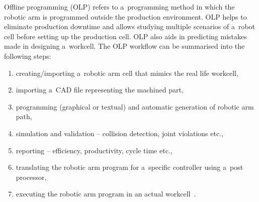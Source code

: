 Offline programming  (OLP) refers to a~programming method in which the robotic arm is programmed outside the production environment. OLP helps to eliminate production downtime and allows studying multiple scenarios of a~robot cell before setting up the production cell. OLP also aids in predicting mistakes made in designing a~workcell. The OLP workflow can be summarised into the following steps:

\begin{enumerate}
  \item creating/importing a~robotic arm cell that mimics the real life workcell,
  \item importing a~CAD file representing the machined part,
  \item programming (graphical or textual) and automatic generation of robotic arm path,
  \item simulation and validation -- collision detection, joint violations etc.,
  \item reporting -- efficiency, productivity, cycle time etc.,
  \item translating the robotic arm program for a~specific controller using a~post processor,
  \item executing the robotic arm program in an actual workcell~\cite{offlinesteps}.
\end{enumerate}



